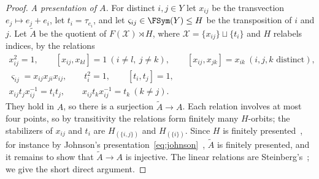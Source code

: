 \begin{proof}
\emph{A presentation of $A$.} For distinct $i,j\in Y$ let $x_{ij}$ be the transvection $e_j\mapsto e_j+e_i$, let $t_i=\tau_{e_i}$, and let
$\varsigma_{ij}\in\FSym(Y)\le H$ be the transposition of $i$ and $j$. Let $\widetilde A$ be the quotient of $F(\mathcal X)\rtimes H$, where
$\mathcal X=\{x_{ij}\}\sqcup\{t_i\}$ and $H$ relabels indices, by the relations
\begin{gather*}
x_{ij}^2=1,\qquad [x_{ij},x_{kl}]=1\ (i\ne l,\ j\ne k),\qquad [x_{ij},x_{jk}]=x_{ik}\ (i,j,k\text{ distinct}),\\
\varsigma_{ij}=x_{ij}x_{ji}x_{ij},\qquad t_i^2=1,\qquad [t_i,t_j]=1,\\
x_{ij}t_jx_{ij}^{-1}=t_it_j,\qquad x_{ij}t_kx_{ij}^{-1}=t_k\ (k\ne j).
\end{gather*}
They hold in $A$, so there is a surjection $\widetilde A\to A$. Each relation involves at most four points, so by transitivity the relations form
finitely many $H$-orbits; the stabilizers of $x_{ij}$ and $t_i$ are $H_{(\{i,j\})}$ and $H_{(\{i\})}$. Since $H$ is finitely presented~\cite{Brown1987}, for instance by
Johnson's presentation~\eqref{eq:johnson}~\cite{Johnson1999}, $\widetilde A$ is finitely presented, and it
remains to show that $\widetilde A\to A$ is injective. The linear relations are Steinberg's~\cite{Milnor1971}; we give the short direct argument.


\end{proof}
